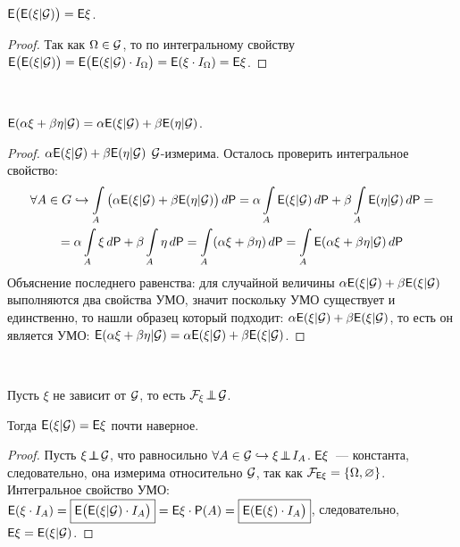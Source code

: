\begin{property}~

	 $\mathsf{E} \big( \mathsf{E}( \xi | \mathcal{G}) \big) = \mathsf{E}\xi$.
	 \begin{proof}
	 	Так как $\Omega \in \mathcal{G}$, то по интегральному свойству $\mathsf{E} \big( \mathsf{E}(\xi | \mathcal{G}) \big) = \mathsf{E} \big( \mathsf{E}(\xi | \mathcal{G} ) \cdot I_\Omega \big) = \mathsf{E}( \xi \cdot I_\Omega) = \mathsf{E}\xi$.
	 \end{proof}
\end{property}

\begin{property}[линейность]~

	$\mathsf{E} (\alpha \xi + \beta \eta | \mathcal{G} ) = \alpha \mathsf{E}( \xi | \mathcal{G}) + \beta \mathsf{E}(\eta |\mathcal{G})$.
	\begin{proof}
		$\alpha \mathsf{E}(\xi | \mathcal{G}) + \beta \mathsf{E}(\eta | \mathcal{G})$ $\mathcal{G}$-измерима. Осталось проверить интегральное свойство:
		\begin{multline*}
			\forall A \in G \hookrightarrow \int\limits_A \big( \alpha \mathsf{E}( \xi | \mathcal{G}) + \beta \mathsf{E}( \eta | \mathcal{G}) \big) \, d \mathsf{P} = \alpha \int\limits_A \mathsf{E}( \xi | \mathcal{G}) \, d \mathsf{P} + \beta \int\limits_A \mathsf{E}( \eta | \mathcal{G} ) \, d \mathsf{P} = \\ 
			= \alpha \int\limits_A \xi \, d \mathsf{P} + \beta \int\limits_A \eta \, d \mathsf{P} = \int\limits_A (\alpha \xi + \beta \eta ) \, d\mathsf{P} = \int\limits_A \mathsf{E}( \alpha\xi + \beta\eta|\mathcal{G}) \, d \mathsf{P}
		\end{multline*}
		Объяснение последнего равенства: для случайной величины $\alpha\mathsf{E}(\xi|\mathcal{G}) + \beta\mathsf{E}(\xi|\mathcal{G})$ выполняются два свойства УМО, значит поскольку УМО существует и единственно, то нашли образец который подходит: $\alpha\mathsf{E}(\xi|\mathcal{G}) + \beta\mathsf{E}(\xi|\mathcal{G})$, то есть он является УМО: $\mathsf{E}(\alpha\xi + \beta\eta|\mathcal{G}) = \alpha\mathsf{E}(\xi|\mathcal{G}) + \beta\mathsf{E}(\xi|\mathcal{G})$.
	\end{proof}
\end{property}

\begin{property}~

	Пусть $\xi$ не зависит от $\mathcal{G}$, то есть $\mathcal{F}_\xi \!\perp\!\!\!\!\perp\! \mathcal{G}$. 
	
	Тогда $\mathsf{E} ( \xi | \mathcal{G}) = \mathsf{E} \xi$ почти наверное.
	\begin{proof}
		Пусть $\xi \!\perp\!\!\!\!\perp\! \mathcal{G}$, что равносильно $\forall A \in \mathcal{G} \hookrightarrow \xi \!\perp\!\!\!\!\perp\! I_A$. $\mathsf{E} \xi$~--- константа, следовательно, она измерима относительно $\mathcal{G}$, так как $\mathcal{F}_{\mathsf{E} \xi} = \{ \Omega, \varnothing \}$. Интегральное свойство УМО: $\mathsf{E} ( \xi \cdot I_A) = \boxed{\mathsf{E} \big( \mathsf{E}( \xi | \mathcal{G}) \cdot I_A \big)} = \mathsf{E} \xi \cdot \mathsf{P}(A) = \boxed{\mathsf{E}(\mathsf{E}(\xi) \cdot I_A \big)}$, следовательно, $\mathsf{E} \xi = \mathsf{E}( \xi | \mathcal{G})$.
	\end{proof}
\end{property}


